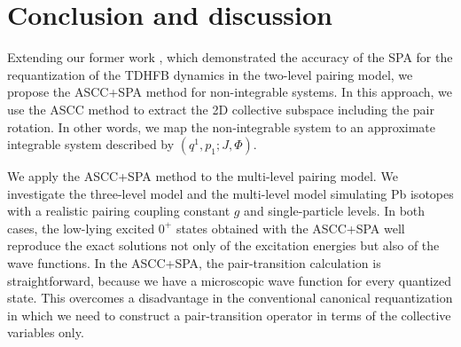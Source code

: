 \documentclass[%
superscriptaddress,
showpacs,
nofootinbib,
amsmath,amssymb,
aps,
prc,
twocolumn,
floatfix ]%
{revtex4-1}
\begin{document}





\section{Conclusion and discussion}
\label{sec5}

Extending our former work \cite{NN18},
which demonstrated the accuracy of the SPA for the requantization
of the TDHFB dynamics in the two-level pairing model, 
we propose the ASCC+SPA method for non-integrable systems.
In this approach, we use the ASCC method to extract the 2D
collective subspace including the pair rotation.
In other words, we map the non-integrable system to an approximate
integrable system described by $(q^1,p_1;J,\Phi)$.


We apply the ASCC+SPA method to the multi-level pairing model.
We investigate the three-level model and 
the multi-level model simulating Pb isotopes
with a realistic pairing coupling constant $g$ and single-particle levels.
In both cases, the low-lying excited $0^+$ states obtained with
the ASCC+SPA well reproduce the exact solutions
not only of the excitation energies but also of the wave functions.
In the ASCC+SPA, the pair-transition calculation is straightforward,
because we have a microscopic wave function for every quantized state.
This overcomes a disadvantage in the conventional canonical requantization
in which we need to construct a pair-transition operator
in terms of the collective variables only.
\end{document}
